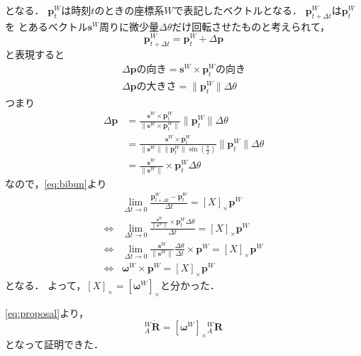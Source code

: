 となる．
$\boldsymbol{p}^{W}_{t}$は時刻$t$のときの座標系$W$で表記したベクトルとなる．
$\boldsymbol{p}^{W}_{t+ \Delta t}$は$\boldsymbol{p}^{W}_{t}$を
とあるベクトル$\boldsymbol{s}^{W}$周りに微少量$\Delta \theta$だけ回転させたものと考えられて，
\begin{equation}
  \boldsymbol{p}^{W}_{t+ \Delta t} = \boldsymbol{p}^{W}_{t} + \Delta \boldsymbol{p}
\end{equation}
と表現すると
\begin{gather}
  \Delta \boldsymbol{p}\text{の向き} = \boldsymbol{s}^{W} \times \boldsymbol{p}^{W}_{t}\text{の向き}\\
  \Delta \boldsymbol{p}\text{の大きさ} = \lVert \boldsymbol{p}^{W}_{t} \rVert \Delta \theta
\end{gather}
つまり
\begin{align}
  \Delta \boldsymbol{p} &= \frac{\boldsymbol{s}^{W} \times \boldsymbol{p}^{W}_t}{\lVert \boldsymbol{s}^{W} \times \boldsymbol{p}^{W}_t \rVert} \lVert \boldsymbol{p}^{W}_t \rVert \Delta \theta\\
  & = \frac{\boldsymbol{s}^{W} \times \boldsymbol{p}^{W}_t}{\lVert \boldsymbol{s}^{W} \rVert \lVert \boldsymbol{p}^{W}_t \rVert \sin \left(\frac{\pi}{2}\right)} \lVert \boldsymbol{p}^{W}_t \rVert \Delta \theta\\
  & = \frac{\boldsymbol{s}^{W}}{\lVert \boldsymbol{s}^{W} \rVert} \times \boldsymbol{p}^{W}_t\Delta \theta
\end{align}
なので，\autoref{eq:bibun}より
\begin{align}
  & \lim_{\Delta t \to 0} \frac{\boldsymbol{p}^{W}_{t+ \Delta t} - \boldsymbol{p}^{W}_{t}}{\Delta t} = [X]_{\times} \boldsymbol{p}^{W}\\
  \Leftrightarrow & \lim_{\Delta t \to 0} \frac{\frac{\boldsymbol{s}^{W}}{\lVert \boldsymbol{s}^{W} \rVert} \times \boldsymbol{p}^{W}_{t}\Delta \theta}{\Delta t} = [X]_{\times} \boldsymbol{p}^{W}\\
  \Leftrightarrow & \lim_{\Delta t \to 0} \frac{\boldsymbol{s}^{W}}{\lVert \boldsymbol{s}^{W} \rVert} \frac{\Delta \theta}{\Delta t} \times \boldsymbol{p}^{W} = [X]_{\times} \boldsymbol{p}^{W}\\
  \Leftrightarrow & \boldsymbol{\omega}^{W} \times \boldsymbol{p}^{W} = [X]_{\times} \boldsymbol{p}^{W}\label{eq:result}
\end{align}
となる．
よって，$[X]_{\times} = [\boldsymbol{\omega}^{W}]_{\times}$と分かった．

\autoref{eq:proposal}より，
\begin{equation}
  {}^{W}_{A}\dot{\boldsymbol{R}} = [\boldsymbol{\omega}^{W}]_{\times} {}^{W}_{A}\boldsymbol{R}
\end{equation}
となって証明できた．

